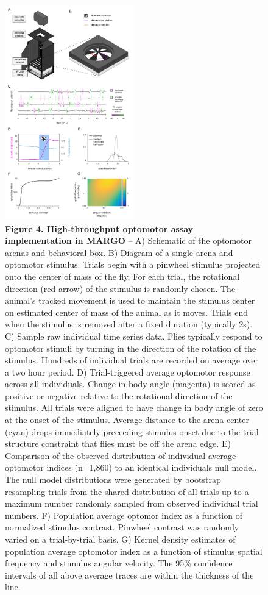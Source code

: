 \documentclass[10pt]{article}
\begin{document}
\newpage
\begin{figure}[h!]
	\begin{center}
		\includegraphics[width=0.5\textwidth]{../figures/Optomotor_panel.pdf}
	\end{center}
	\caption*{\footnotesize \textbf{Figure 4. High-throughput optomotor assay implementation in MARGO} -- A) Schematic of the optomotor arenas and behavioral box. B) Diagram of a single arena and optomotor stimulus. Trials begin with a pinwheel stimulus projected onto the center of mass of the fly. For each trial, the rotational direction (red arrow) of the stimulus is randomly chosen. The animal's tracked movement is used to maintain the stimulus center on estimated center of mass of the animal as it moves. Trials end when the stimulus is removed after a fixed duration (typically 2s). C) Sample raw individual time series data. Flies typically respond to optomotor stimuli by turning in the direction of the rotation of the stimulus. Hundreds of individual trials are recorded on average over a two hour period. D) Trial-triggered average optomotor response across all individuals. Change in body angle (magenta) is scored as positive or negative relative to the rotational direction of the stimulus. All trials were aligned to have change in body angle of zero at the onset of the stimulus. Average distance to the arena center (cyan) drops immediately preceeding stimulus onset due to the trial structure constraint that flies must be off the arena edge. E) Comparison of the observed distribution of individual average optomotor indices (n=1,860) to an identical individuals null model. The null model distributions were generated by bootstrap resampling trials from the shared distribution of all trials up to a maximum number randomly sampled from observed individual trial numbers. F) Population average optomor index as a function of normalized stimulus contrast. Pinwheel contrast was randomly varied on a trial-by-trial basis. G) Kernel density estimates of population average optomotor index as a function of stimulus spatial frequency and stimulus angular velocity. The 95\% confidence intervals of all above average traces are within the thickness of the line.}
\end{figure}
\end{document}
